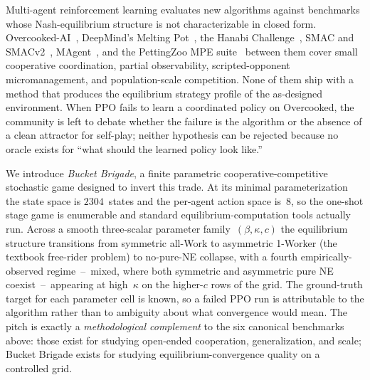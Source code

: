 \documentclass{anvil-paper}
\begin{document}
Multi-agent reinforcement learning evaluates new algorithms against benchmarks
whose Nash-equilibrium structure is not characterizable in closed form.
Overcooked-AI~\citep{overcooked2019}, DeepMind's Melting
Pot~\citep{meltingpot2021}, the Hanabi
Challenge~\citep{hanabi2020}, SMAC and SMACv2~\citep{smac2019,smacv2_2023},
MAgent~\citep{magent2018}, and the PettingZoo MPE
suite~\citep{pettingzoo2021} between them cover small cooperative
coordination, partial observability, scripted-opponent micromanagement, and
population-scale competition. None of them ship with a method that produces
the equilibrium strategy profile of the as-designed environment. When PPO
fails to learn a coordinated policy on Overcooked, the community is left to
debate whether the failure is the algorithm or the absence of a clean
attractor for self-play; neither hypothesis can be rejected because no oracle
exists for ``what should the learned policy look like.''

We introduce \emph{Bucket Brigade}, a finite parametric cooperative-competitive
stochastic game designed to invert this trade. At its minimal parameterization
the state space is $2304$~states and the per-agent action space is~$8$, so the
one-shot stage game is enumerable and standard equilibrium-computation tools
actually run. Across a smooth three-scalar parameter family~$(\beta,\kappa,c)$
the equilibrium structure transitions from symmetric all-Work to asymmetric
1-Worker (the textbook free-rider problem) to no-pure-NE collapse, with a
fourth empirically-observed regime~--~\textsf{mixed}, where both symmetric
and asymmetric pure NE coexist~--~appearing at high~$\kappa$ on the
higher-$c$ rows of the grid. The ground-truth target for each parameter cell
is known, so a failed PPO run is attributable to the algorithm rather than
to ambiguity about what convergence would mean. The pitch is exactly a
\emph{methodological complement} to the six canonical benchmarks above: those
exist for studying open-ended cooperation, generalization, and scale; Bucket
Brigade exists for studying equilibrium-convergence quality on a controlled
grid.
\end{document}
